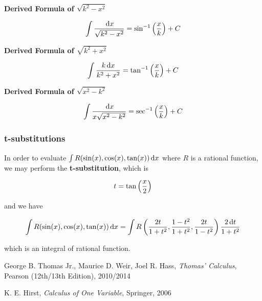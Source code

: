\documentclass[a4paper,12pt]{article}
\begin{document}
\begin{alist}
  \item \textbf{Derived Formula of $\sqrt{k^{2}-x^{2}}$}

  $$\int\frac{\,\mathrm{d} x}{\sqrt{k^{2}-x^{2}}}=\sin^{-1}\left( \frac{x}{k}\right)+C$$

  \item \textbf{Derived Formula of $\sqrt{k^{2}+x^{2}}$}

  $$\int\frac{k\,\mathrm{d} x}{k^{2}+x^{2}}=\tan^{-1}\left( \frac{x}{k}\right)+C$$

  \item \textbf{Derived Formula of $\sqrt{x^{2}-k^{2}}$}

  $$\int\frac{\,\mathrm{d} x}{x\sqrt{x^{2}-k^{2}}}=\sec^{-1}\left( \frac{x}{k}\right)+C$$
\end{alist}

\subsubsection{t-substitutions}
In order to evaluate $\int R(\sin(x),\cos(x),\tan(x))\,\mathrm{d} x$ where $R$ is a rational function, we may perform the \textbf{t-substitution}, which is

$$t=\tan\left( \frac{x}{2}\right)$$\s

and we have

$$\int R(\sin(x),\cos(x),\tan(x))\,\mathrm{d} x=\int R\left( \frac{2t}{1+t^{2}},\frac{1-t^{2}}{1+t^{2}},\frac{2t}{1-t^{2}}\right)\frac{2\,\mathrm{d} t}{1+t^{2}}$$\s

which is an integral of rational function.



\begin{reflist}
  \item George B. Thomas Jr., Maurice D. Weir, Joel R. Hass, \textit{Thomas' Calculus}, Pearson (12th/13th Edition), 2010/2014
  \item K. E. Hirst, \textit{Calculus of One Variable}, Springer, 2006
\end{reflist}
\end{document}
